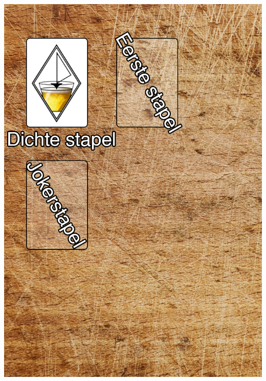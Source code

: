 \begin{minipage}[t]{.48\textwidth}
\includegraphics[width=.96\textwidth]{img/Frits_plank_v3.png}
\end{minipage}
\hfill \vrule \hspace{0.3cm}
